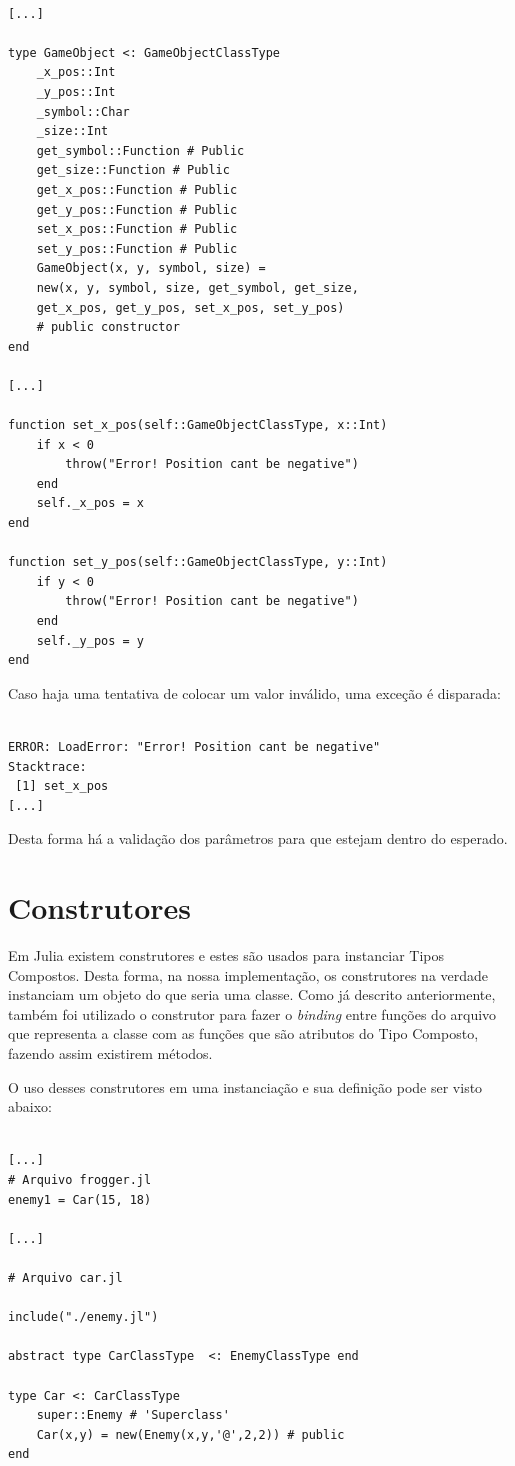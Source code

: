 \documentclass[rel_mlp]{iiufrgs}
\begin{document}
\begin{lstlisting}[frame=single]

[...]

type GameObject <: GameObjectClassType
	_x_pos::Int
	_y_pos::Int
	_symbol::Char
	_size::Int
	get_symbol::Function # Public
	get_size::Function # Public
	get_x_pos::Function # Public
	get_y_pos::Function # Public
	set_x_pos::Function # Public
	set_y_pos::Function # Public
	GameObject(x, y, symbol, size) = 
	new(x, y, symbol, size, get_symbol, get_size, 
	get_x_pos, get_y_pos, set_x_pos, set_y_pos) 
	# public constructor
end

[...]

function set_x_pos(self::GameObjectClassType, x::Int)
	if x < 0
		throw("Error! Position cant be negative")
	end	
	self._x_pos = x
end

function set_y_pos(self::GameObjectClassType, y::Int)
	if y < 0
		throw("Error! Position cant be negative")
	end	
	self._y_pos = y
end

\end{lstlisting}


Caso haja uma tentativa de colocar um valor inválido, uma exceção é disparada:
\begin{lstlisting}[frame=single]

ERROR: LoadError: "Error! Position cant be negative"
Stacktrace:
 [1] set_x_pos
[...]
\end{lstlisting}


Desta forma há a validação dos parâmetros para que estejam dentro do esperado.

\section{Construtores}

Em Julia existem construtores e estes são usados para instanciar Tipos Compostos. Desta forma, na nossa implementação, os construtores na verdade instanciam um objeto do que seria uma classe. Como já descrito anteriormente, também foi utilizado o construtor para fazer o \textit{binding} entre funções do arquivo que representa a classe com as funções que são atributos do Tipo Composto, fazendo assim existirem métodos.

O uso desses construtores em uma instanciação e sua definição pode ser visto abaixo:
\begin{lstlisting}[frame=single]

[...]
# Arquivo frogger.jl
enemy1 = Car(15, 18)

[...]

# Arquivo car.jl

include("./enemy.jl")

abstract type CarClassType  <: EnemyClassType end  

type Car <: CarClassType 
    super::Enemy # 'Superclass'
	Car(x,y) = new(Enemy(x,y,'@',2,2)) # public
end

\end{lstlisting}
\end{document}

